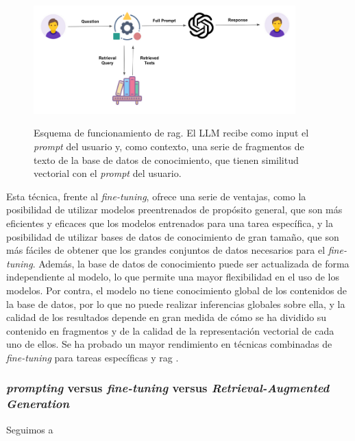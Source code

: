 \begin{figure}[H]
    \caption[Esquema de funcionamiento de RAG]{Esquema de funcionamiento de \gls{rag}. El LLM recibe como input el \textit{prompt} del usuario y, como contexto, una serie de fragmentos de texto de la base de datos de conocimiento, que tienen similitud vectorial con el \textit{prompt} del usuario.}
    \centering
    \includegraphics[width=0.9\textwidth]{./figuras/rag.png}
    \label{fig:rag}
\end{figure}

Esta técnica, frente al \textit{fine-tuning}, ofrece una serie de ventajas, como la posibilidad de utilizar modelos preentrenados de propósito general, que son más eficientes y eficaces que los modelos entrenados para una tarea específica, y la posibilidad de utilizar bases de datos de conocimiento de gran tamaño, que son más fáciles de obtener que los grandes conjuntos de datos necesarios para el \textit{fine-tuning}. Además, la base de datos de conocimiento puede ser actualizada de forma independiente al modelo, lo que permite una mayor flexibilidad en el uso de los modelos. Por contra, el modelo no tiene conocimiento global de los contenidos de la base de datos, por lo que no puede realizar inferencias globales sobre ella, y la calidad de los resultados depende en gran medida de cómo se ha dividido su contenido en fragmentos y de la calidad de la representación vectorial de cada uno de ellos. Se ha probado un mayor rendimiento en técnicas combinadas de \textit{fine-tuning} para tareas específicas y \gls{rag} \citep{lewisRetrievalAugmentedGenerationKnowledgeIntensive2021}.


\subsubsection{\textit{prompting} versus \textit{fine-tuning} versus \textit{Retrieval-Augmented Generation}}

Seguimos a \cite{arunbijiRAGVsFinetuning}


